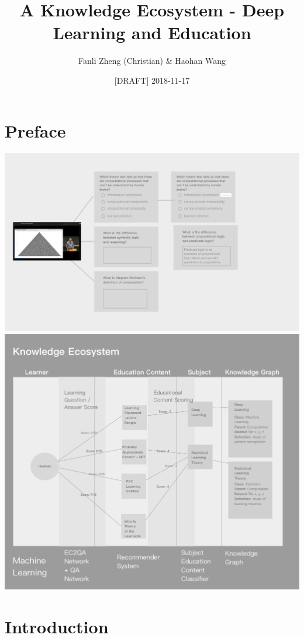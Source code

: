 \documentclass[]{book}
\title{A Knowledge Ecosystem - Deep Learning and Education}
\author{Fanli Zheng (Christian) \& Haohan Wang}
\date{{[}DRAFT{]} 2018-11-17}
\theoremstyle{definition}
\theoremstyle{definition}
\theoremstyle{definition}
\theoremstyle{remark}
\begin{document}
\maketitle

{
\hypersetup{linkcolor=black}
\setcounter{tocdepth}{1}
\tableofcontents
}
\chapter*{Preface}\label{preface}

\includegraphics{img/MtoQA.png}
\includegraphics{img/knowledgeEcosystem.png}

\chapter{Introduction}\label{introduction}
\end{document}
